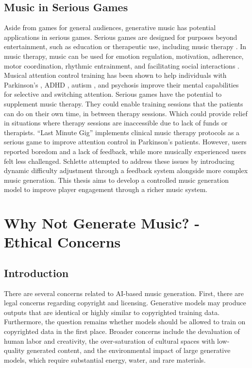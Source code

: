\subsection{Music in Serious Games}
Aside from games for general audiences, generative music has potential applications in serious games. Serious games are designed for purposes beyond entertainment, such as education or therapeutic use, including music therapy \cite{Djaouti2011}. In music therapy, music can be used for emotion regulation, motivation, adherence, motor coordination, rhythmic entrainment, and facilitating social interactions \cite{musicwellbeing_agres_2021}. Musical attention control training has been shown to help individuals with Parkinson’s \cite{Park_Kim_2021}, ADHD \cite{Martin-Moratinos_Bella-Fernández_Blasco-Fontecilla_2023}, autism \cite{Pasiali_LaGasse_Penn_2014}, and psychosis \cite{van_Alphen_Stams_Hakvoort_2019} improve their mental capabilities for selective and switching attention. Serious games have the potential to supplement music therapy. They could enable training sessions that the patients can do on their own time, in between therapy sessions. Which could provide relief in situations where therapy sessions are inaccessible due to lack of funds or therapists.   “Last Minute Gig” \cite{Chalkiadakis_2022} implements clinical music therapy protocols as a serious game to improve attention control in Parkinson’s patients. However, users reported boredom and a lack of feedback, while more musically experienced users felt less challenged. Schlette \cite{Schlette_2022} attempted to address these issues by introducing dynamic difficulty adjustment through a feedback system alongside more complex music generation. This thesis aims to develop a controlled music generation model to improve player engagement through a richer music system.
\section{Why Not Generate Music? - Ethical Concerns} \label{section:ethical}
\subsection{Introduction}
There are several concerns related to AI-based music generation. First, there are legal concerns regarding copyright and licensing. Generative models may produce outputs that are identical or highly similar to copyrighted training data. Furthermore, the question remains whether models should be allowed to train on copyrighted data in the first place. Broader concerns include the devaluation of human labor and creativity, the over-saturation of cultural spaces with low-quality generated content, and the environmental impact of large generative models, which require substantial energy, water, and rare materials.

